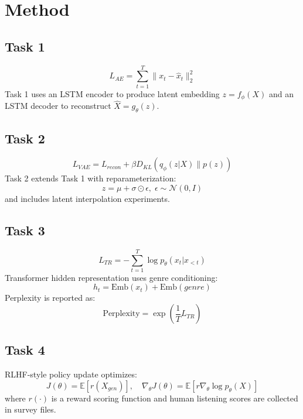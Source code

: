 \documentclass[conference]{IEEEtran}
\begin{document}
\section{Method}
\subsection{Task 1}
\begin{equation}
L_{AE}=\sum_{t=1}^{T}\|x_t-\hat{x}_t\|_2^2
\end{equation}
Task 1 uses an LSTM encoder to produce latent embedding $z=f_{\phi}(X)$ and an LSTM decoder to reconstruct $\hat{X}=g_{\theta}(z)$.

\subsection{Task 2}
\begin{equation}
L_{VAE}=L_{recon}+\beta D_{KL}(q_\phi(z|X)\|p(z))
\end{equation}
Task 2 extends Task 1 with reparameterization:
\begin{equation}
z=\mu+\sigma\odot\epsilon,\;\epsilon\sim\mathcal{N}(0,I)
\end{equation}
and includes latent interpolation experiments.

\subsection{Task 3}
\begin{equation}
L_{TR}=-\sum_{t=1}^{T}\log p_\theta(x_t|x_{<t})
\end{equation}
Transformer hidden representation uses genre conditioning:
\begin{equation}
h_t=\text{Emb}(x_t)+\text{Emb}(genre)
\end{equation}
Perplexity is reported as:
\begin{equation}
\text{Perplexity}=\exp\left(\frac{1}{T}L_{TR}\right)
\end{equation}

\subsection{Task 4}
RLHF-style policy update optimizes:
\begin{equation}
J(\theta)=\mathbb{E}[r(X_{gen})],\quad \nabla_\theta J(\theta)=\mathbb{E}[r\nabla_\theta \log p_\theta(X)]
\end{equation}
where $r(\cdot)$ is a reward scoring function and human listening scores are collected in survey files.
\end{document}
